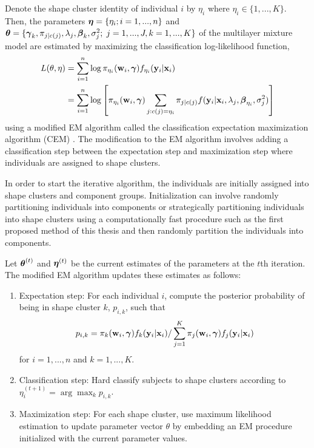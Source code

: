 Denote the shape cluster identity of individual $i$ by $\eta_{i}$ where $\eta_{i}\in\{1,...,K\}$. Then, the parameters $\boldsymbol\eta = \{\eta_{i}; i=1,...,n\}$ and $\boldsymbol\theta=\{\boldsymbol \gamma_{k}, \pi_{j|c(j)},\lambda_{j}, \boldsymbol\beta_{k},\sigma^{2}_{j};\; j=1,...,J, k=1,...,K\}$ of the multilayer mixture model are estimated by maximizing the classification log-likelihood function,
\begin{align}
 L(\theta,\eta) &= \sum^{n}_{i=1} \log \pi_{\eta_{i}}(\mathbf w_{i},\boldsymbol\gamma) f_{\eta_{i}}(\mathbf y_{i}|\mathbf x_{i})\\
\label{ll}& =  \sum^{n}_{i=1} \log\left[ \pi_{\eta_{i}}(\mathbf w_{i},\boldsymbol\gamma)  \sum_{j: c(j) = \eta_{i}} \pi_{j|c(j)}f(\mathbf y_{i}|\mathbf x_{i},\lambda_{j},\boldsymbol\beta_{\eta_{i}},\sigma^{2}_{j})\right]
\end{align} 
using a modified EM algorithm called the classification expectation maximization algorithm (CEM) \cite{celeux1992, mclachlan2000}. The modification to the EM algorithm involves adding a classification step between the expectation step and maximization step where individuals are assigned to shape clusters. 

In order to start the iterative algorithm, the individuals are initially assigned into shape clusters and component groups. Initialization can involve randomly partitioning individuals into components or strategically partitioning individuals into shape clusters using a computationally fast procedure such as the first proposed method of this thesis and then randomly partition the individuals into components. 

Let $\boldsymbol\theta^{(t)}$ and $\boldsymbol\eta^{(t)}$ be the current estimates of the parameters at the $t$th iteration. The modified EM algorithm updates these estimates as follows:
\begin{enumerate}
\item Expectation step: For each individual $i$, compute the posterior probability of being in shape cluster $k$, $p_{i,k}$, such that
$$p_{i,k}= \pi_{k}(\mathbf w_{i},\boldsymbol\gamma)f_{k}(\mathbf y_{i}|\mathbf x_{i})/\sum^{K}_{j=1} \pi_{j}(\mathbf w_{i},\boldsymbol\gamma)f_{j}(\mathbf y_{i}|\mathbf x_{i})$$
for $i=1,...,n$ and $k=1,...,K$.
\item Classification step: Hard classify subjects to shape clusters according to $\eta^{(t+1)}_{i} = \arg\max_{k} p_{i,k}$.
\item Maximization step: For each shape cluster, use maximum likelihood estimation to update parameter vector $\theta$ by embedding an EM procedure initialized with the current parameter values.
\end{enumerate} 

